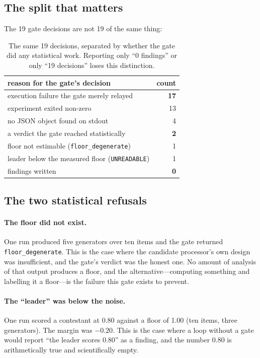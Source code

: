\documentclass[11pt]{article}
\newcommand{\code}[1]{{\small\texttt{#1}}}
\begin{document}
\subsection{The split that matters}

The 19 gate decisions are not 19 of the same thing:

\begin{table}[t]
\centering\small
\begin{tabular}{lr}
\toprule
reason for the gate's decision & count\\
\midrule
execution failure the gate merely relayed & \textbf{17}\\
\quad experiment exited non-zero & 13\\
\quad no JSON object found on stdout & 4\\
\addlinespace
a verdict the gate reached statistically & \textbf{2}\\
\quad floor not estimable (\code{floor\_degenerate}) & 1\\
\quad leader below the measured floor (\code{UNREADABLE}) & 1\\
\midrule
findings written & \textbf{0}\\
\bottomrule
\end{tabular}
\caption{The same 19 decisions, separated by whether the gate did any
statistical work. Reporting only ``0 findings'' or only ``19 decisions''
loses this distinction.}
\label{tab:split}
\end{table}

\subsection{The two statistical refusals}

\paragraph{The floor did not exist.} One run produced five generators over ten
items and the gate returned \code{floor\_degenerate}. This is the case where
the candidate processor's own design was insufficient, and the gate's verdict
was the honest one. No amount of analysis of that output produces a floor, and
the alternative---computing something and labelling it a floor---is the failure
this gate exists to prevent.

\paragraph{The ``leader'' was below the noise.} One run scored a contestant at
0.80 against a floor of 1.00 (ten items, three generators). The margin was
$-0.20$. This is the case where a loop without a gate would report ``the
leader scores 0.80'' as a finding, and the number 0.80 is arithmetically true
and scientifically empty.
\end{document}
